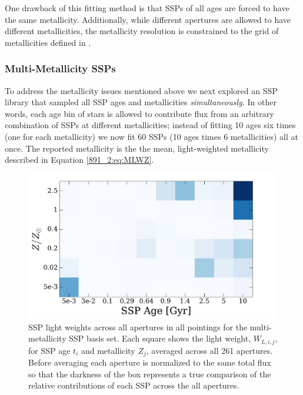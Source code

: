 One drawback of this fitting method is that SSPs of all ages are
forced to have the same metallicity. Additionally, while different
apertures are allowed to have different metallicities, the metallicity
resolution is constrained to the grid of metallicities defined in
\citet{Bruzual03}.

\subsubsection{Multi-Metallicity SSPs}
\label{891_2:sec:multi_metal}
To address the metallicity issues mentioned above we next explored an
SSP library that sampled all SSP ages and metallicities
\emph{simultaneously}. In other words, each age bin of stars is
allowed to contribute flux from an arbitrary combination of SSPs at
different metallicities; instead of fitting 10 ages six times (one for
each metallicity) we now fit 60 SSPs (10 ages times 6 metallicities)
all at once. The reported metallicity is the the mean, light-weighted
metallicity described in Equation \ref{891_2:eq:MLWZ}.

\begin{figure}
  \centering
  \includegraphics[width=\columnwidth]{891_2/figs/allZ2_all_weights.pdf}
  \caption[Example of SSP light-weights for 61 parameter
    fit]{\fixspacing\label{891_2:fig:multiZ_weights}SSP light weights
    across all apertures in all pointings for the multi-metallicity
    SSP basis set. Each square shows the light weight, $W_{L,i,j}$,
    for SSP age $t_i$ and metallicity $Z_j$, averaged across all 261
    apertures. Before averaging each aperture is normalized to the
    same total flux so that the darkness of the box represents a true
    comparison of the relative contributions of each SSP across the
    all apertures.}
\end{figure}

